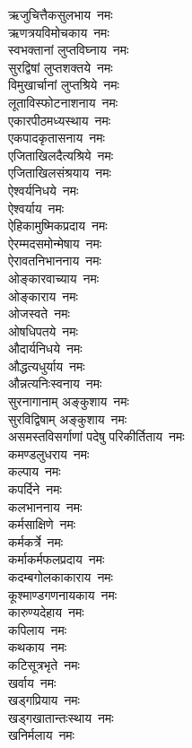 \begin{multicols}{2}
\begin{flushleft}
ऋजुचित्तैकसुलभाय~नमः\\
ऋणत्रयविमोचकाय~नमः\\
स्वभक्तानां लुप्तविघ्नाय~नमः\\
सुरद्विषां लुप्तशक्तये~नमः\\
विमुखार्चानां लुप्तश्रिये~नमः\\
लूताविस्फोटनाशनाय~नमः\\
एकारपीठमध्यस्थाय~नमः\\
एकपादकृतासनाय~नमः\\
एजिताखिलदैत्यश्रिये~नमः\hfill{}\\
एजिताखिलसंश्रयाय~नमः\\
ऐश्वर्यनिधये~नमः\\
ऐश्वर्याय~नमः\\
ऐहिकामुष्मिकप्रदाय~नमः\\
ऐरम्मदसमोन्मेषाय~नमः\\
ऐरावतनिभाननाय~नमः\\
ओङ्कारवाच्याय~नमः\\
ओङ्काराय~नमः\\
ओजस्वते~नमः\\
ओषधिपतये~नमः\hfill{}\\
औदार्यनिधये~नमः\\
औद्धत्यधुर्याय~नमः\\
औन्नत्यनिःस्वनाय~नमः\\
सुरनागानाम् अङ्कुशाय~नमः\\
सुरविद्विषाम् अङ्कुशाय~नमः\\
असमस्तविसर्गाणां पदेषु परिकीर्तिताय~नमः\\
कमण्डलुधराय~नमः\\
कल्पाय~नमः\\
कपर्दिने~नमः\\
कलभाननाय~नमः\hfill{}\\
कर्मसाक्षिणे~नमः\\
कर्मकर्त्रे~नमः\\
कर्माकर्मफलप्रदाय~नमः\\
कदम्बगोलकाकाराय~नमः\\
कूश्माण्डगणनायकाय~नमः\\
कारुण्यदेहाय~नमः\\
कपिलाय~नमः\\
कथकाय~नमः\\
कटिसूत्रभृते~नमः\\
खर्वाय~नमः\hfill{}\\
खड्गप्रियाय~नमः\\
खड्गखातान्तःस्थाय~नमः\\
खनिर्मलाय~नमः\\

\end{flushleft}
\end{multicols}
